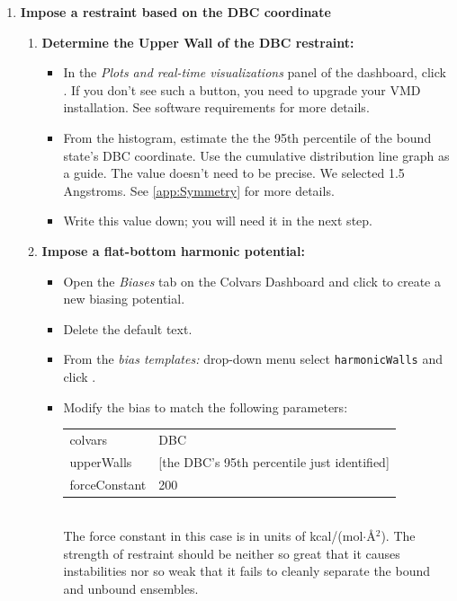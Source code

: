 \documentclass[9pt,tutorial]{Styling/livecoms}
\newcommand{\button}[1]{
  \inlineBox[gray]{\texttt{#1}}
}
\newcommand{\menu}[1]{
  \textit{#1}
}
\newcommand{\option}[1]{
  \texttt{#1}
}
\begin{document}
\begin{enumerate}
        
        \item \textbf{Impose a restraint based on the DBC coordinate}
        \begin{enumerate}[label=\alph*., ref=\theenumi.\alph*]
            \item \textbf{Determine the Upper Wall of the DBC restraint:}
            \begin{itemize}
                \item In the \menu{Plots and real-time visualizations} panel of the dashboard, click \button{Histogram}. 
                If you don't see such a button, you need to upgrade your VMD installation. See software requirements for more details.
                \item From the histogram, estimate the  the 95th percentile of the bound state's DBC coordinate. Use the cumulative distribution line graph as a guide. The value doesn't need to be precise.  We selected 1.5 Angstroms. See \ref{app:Symmetry} for more details.
                \item Write this value down; you will need it in the next step. 
            \end{itemize}
            \item \textbf{Impose a flat-bottom harmonic potential:}
            \label{step:createDBC}
            \begin{itemize}
                \item Open the \menu{Biases} tab on the Colvars Dashboard and click \button{New bias [Ctrl-n]} to create a new biasing potential.
                \item Delete the default text.
                \item From the \menu{bias templates:} drop-down menu select \option{harmonicWalls} and click \button{Insert [Enter]}.
                \item Modify the bias to match the following parameters: \\
                { \ttfamily
                \begin{tabular}{l l}
                    colvars & DBC\\
                    upperWalls & [the DBC's 95th percentile just identified]\\
                    forceConstant & 200 \\
                \end{tabular} }\\
                The force constant in this case is in units of kcal/(mol$\cdot$\AA{}$^2$). The strength of restraint should be neither so great that it causes instabilities nor so weak that it fails to cleanly separate the bound and unbound ensembles. %

\end{itemize}
\end{enumerate}
\end{enumerate}
\end{document}

